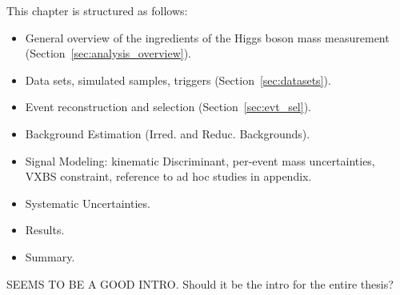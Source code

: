 This chapter is structured as follows:
\begin{itemize}
    \item General overview of the ingredients of the Higgs boson mass measurement (Section~\ref{sec:analysis_overview}).
    \item Data sets, simulated samples, triggers (Section~\ref{sec:datasets}).
    \item Event reconstruction and selection (Section~\ref{sec:evt_sel}).
    \item Background Estimation (Irred. and Reduc. Backgrounds).
    \item Signal Modeling: kinematic Discriminant, per-event mass uncertainties, VXBS constraint, reference to ad hoc studies in appendix.
    \item Systematic Uncertainties.
    \item Results.
    \item Summary.
\end{itemize}

SEEMS TO BE A GOOD INTRO. Should it be the intro for the entire thesis?
